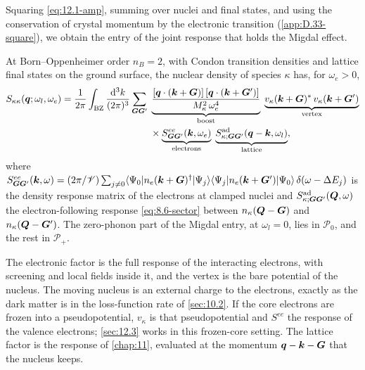 Squaring \cref{eq:12.1-amp}, summing over nuclei and final states, and using the conservation of crystal momentum by the electronic transition (\cref{app:D.33-square}), we obtain the entry of the joint response that holds the Migdal effect.
\begin{keyresult}
At Born--Oppenheimer order $n_B = 2$, with Condon transition densities and lattice final states on the ground surface, the nuclear density of species $\kappa$ has, for $\omega_e > 0$,
\begin{equation}
  \begin{split}
  S_{\kappa\kappa}(\bm{q};\omega_l,\omega_e) = \frac{1}{2\pi}\int_{\mathrm{BZ}}\frac{\mathrm{d}^3k}{(2\pi)^3}\sum_{\bm{G}\bm{G}'}\;
  &\underbrace{\frac{[\bm{q}\cdot(\bm{k}+\bm{G})]\,[\bm{q}\cdot(\bm{k}+\bm{G}')]}{M_\kappa^2\,\omega_e^4}}_{\text{boost}}\;
  \underbrace{v_\kappa(\bm{k}+\bm{G})^*\,v_\kappa(\bm{k}+\bm{G}')}_{\text{vertex}} \\
  &\times\underbrace{S^{ee}_{\bm{G}\bm{G}'}(\bm{k},\omega_e)}_{\text{electrons}}\;
  \underbrace{S^{\mathrm{ad}}_{\kappa;\bm{G}\bm{G}'}(\bm{q} - \bm{k},\omega_l)}_{\text{lattice}} ,
  \end{split}
  \label{eq:12.1-Skk}
\end{equation}
where $S^{ee}_{\bm{G}\bm{G}'}(\bm{k},\omega) = (2\pi/\mathscr{V})\sum_{j\neq0}\langle\Psi_0|n_e(\bm{k}+\bm{G})^\dagger|\Psi_j\rangle\langle\Psi_j|n_e(\bm{k}+\bm{G}')|\Psi_0\rangle\,\delta(\omega - \Delta E_j)$ is the density response matrix of the electrons at clamped nuclei and $S^{\mathrm{ad}}_{\kappa;\bm{G}\bm{G}'}(\bm{Q},\omega)$ the electron-following response \cref{eq:8.6-sector} between $n_\kappa(\bm{Q} - \bm{G})$ and $n_\kappa(\bm{Q} - \bm{G}')$. The zero-phonon part of the Migdal entry, at $\omega_l = 0$, lies in $\mathcal{P}_0$, and the rest in $\mathcal{P}_+$.
\end{keyresult}
\noindent The electronic factor is the full response of the interacting electrons, with screening and local fields inside it, and the vertex is the bare potential of the nucleus. The moving nucleus is an external charge to the electrons, exactly as the dark matter is in the loss-function rate of \cref{sec:10.2}. If the core electrons are frozen into a pseudopotential, $v_\kappa$ is that pseudopotential and $S^{ee}$ the response of the valence electrons; \cref{sec:12.3} works in this frozen-core setting. The lattice factor is the response of \cref{chap:11}, evaluated at the momentum $\bm{q} - \bm{k} - \bm{G}$ that the nucleus keeps.

